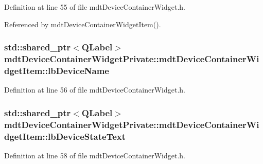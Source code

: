 Definition at line 55 of file mdt\-Device\-Container\-Widget.\-h.



Referenced by mdt\-Device\-Container\-Widget\-Item().

\hypertarget{classmdt_device_container_widget_private_1_1mdt_device_container_widget_item_a8233b97854de9e3b3c391d2f19f7320a}{
\subsubsection[{lb\-Device\-Name}]{\setlength{\rightskip}{0pt plus 5cm}std\-::shared\-\_\-ptr$<$Q\-Label$>$ mdt\-Device\-Container\-Widget\-Private\-::mdt\-Device\-Container\-Widget\-Item\-::lb\-Device\-Name}}\label{classmdt_device_container_widget_private_1_1mdt_device_container_widget_item_a8233b97854de9e3b3c391d2f19f7320a}


Definition at line 56 of file mdt\-Device\-Container\-Widget.\-h.

\hypertarget{classmdt_device_container_widget_private_1_1mdt_device_container_widget_item_a90e0b939fb6e476fc2d17e620d2f6ed6}{
\subsubsection[{lb\-Device\-State\-Text}]{\setlength{\rightskip}{0pt plus 5cm}std\-::shared\-\_\-ptr$<$Q\-Label$>$ mdt\-Device\-Container\-Widget\-Private\-::mdt\-Device\-Container\-Widget\-Item\-::lb\-Device\-State\-Text}}\label{classmdt_device_container_widget_private_1_1mdt_device_container_widget_item_a90e0b939fb6e476fc2d17e620d2f6ed6}


Definition at line 58 of file mdt\-Device\-Container\-Widget.\-h.



